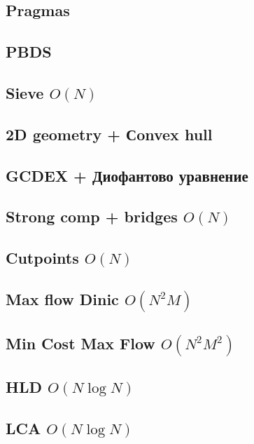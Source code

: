 \documentclass[10pt]{article}
\begin{document}
\begin{multicols}{2}
\subsection{Pragmas}

\subsection{PBDS}

\subsection{Sieve $O(N)$}

\subsection{2D geometry + Сonvex hull}

\subsection{GCDEX + Диофантово уравнение}

\subsection{Strong comp + bridges $O(N)$}

\subsection{Cutpoints $O(N)$}

\subsection{Max flow Dinic $O(N^2M)$}

\subsection{Min Cost Max Flow $O(N^2M^2)$}

\subsection{HLD $O(N\log{N})$}

\subsection{LCA $O(N\log{N})$}


\end{multicols}
\end{document}
